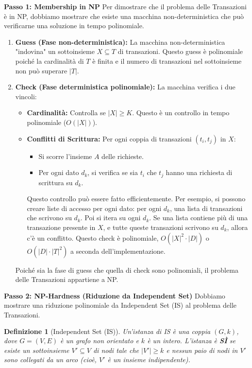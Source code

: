 \documentclass[a4paper]{article}
\newtheorem{definition}{Definizione}
\begin{document}
\textbf{Passo 1: Membership in NP}
Per dimostrare che il problema delle Transazioni è in NP, dobbiamo mostrare che esiste una macchina non-deterministica che può verificarne una soluzione in tempo polinomiale.
\begin{enumerate}
    \item \textbf{Guess (Fase non-deterministica):} La macchina non-deterministica "indovina" un sottoinsieme $X \subseteq T$ di transazioni. Questo guess è polinomiale poiché la cardinalità di $T$ è finita e il numero di transazioni nel sottoinsieme non può superare $|T|$.
    \item \textbf{Check (Fase deterministica polinomiale):} La macchina verifica i due vincoli:
    \begin{itemize}
        \item \textbf{Cardinalità:} Controlla se $|X| \ge K$. Questo è un controllo in tempo polinomiale ($O(|X|)$).
        \item \textbf{Conflitti di Scrittura:} Per ogni coppia di transazioni $(t_i, t_j)$ in $X$:
        \begin{itemize}
            \item Si scorre l'insieme $A$ delle richieste.
            \item Per ogni dato $d_k$, si verifica se sia $t_i$ che $t_j$ hanno una richiesta di scrittura su $d_k$.
        \end{itemize}
        Questo controllo può essere fatto efficientemente. Per esempio, si possono creare liste di accesso per ogni dato: per ogni $d_k$, una lista di transazioni che scrivono su $d_k$. Poi si itera su ogni $d_k$. Se una lista contiene più di una transazione presente in $X$, e tutte queste transazioni scrivono su $d_k$, allora c'è un conflitto. Questo check è polinomiale, $O(|X|^2 \cdot |D|)$ o $O(|D| \cdot |T|^2)$ a seconda dell'implementazione.
    \end{itemize}
    Poiché sia la fase di guess che quella di check sono polinomiali, il problema delle Transazioni appartiene a NP.
\end{enumerate}

\textbf{Passo 2: NP-Hardness (Riduzione da Independent Set)}
Dobbiamo mostrare una riduzione polinomiale da Independent Set (IS) al problema delle Transazioni.
\begin{definition}[Independent Set (IS)]
Un'istanza di IS è una coppia $(G, k)$, dove $G=(V, E)$ è un grafo non orientato e $k$ è un intero. L'istanza è \textbf{SÌ} se esiste un sottoinsieme $V' \subseteq V$ di nodi tale che $|V'| \ge k$ e nessun paio di nodi in $V'$ sono collegati da un arco (cioè, $V'$ è un insieme indipendente).
\end{definition}
\end{document}
